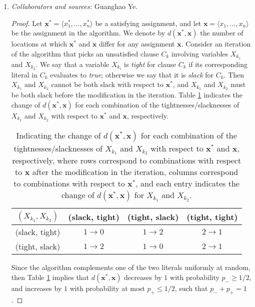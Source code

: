 \documentclass[letterpaper, reqno,11pt]{article}
\begin{document}
\begin{enumerate}
  \item \noindent\emph{Collaborators and sources:} Guanghao Ye.
  
  \begin{proof}
    Let $\mathbf x^* = \langle x_1^*, \ldots, x_n^* \rangle$ be a satisfying assignment, and let $\mathbf x = \langle x_1, \ldots, x_n \rangle$ be the assignment in the algorithm. We denote by $d(\mathbf x^*, \mathbf x)$ the number of locations at which $\mathbf x^*$ and $\mathbf x$ differ for any assignment $\mathbf x$. Consider an iteration of the algorithm that picks an unsatisfied clause $C_k$ involving variables $X_{k_1}$ and $X_{k_2}$. We say that a variable $X_{k_i}$ is \emph{tight} for clause $C_k$ if its corresponding literal in $C_k$ evaluates to \emph{true}; otherwise we say that it is \emph{slack} for $C_k$. Then $X_{k_1}$ and $X_{k_2}$ cannot be both slack with respect to $\mathbf x^*$, and $X_{k_1}$ and $X_{k_2}$ must be both slack before the modification in the iteration. Table \ref{tab:1} indicates the change of $d(\mathbf x^*, \mathbf x)$ for each combination of the tightnesses/slacknesses of $X_{k_1}$ and $X_{k_2}$ with respect to $\mathbf x^*$ and $\mathbf x$, respectively.

    \begin{table}[h]
      \centering
      \begin{tabular}{c||c|c|c}
        $(X_{k_1}, X_{k_2})$ & (slack, tight) & (tight, slack) & (tight, tight) \\
        \hline
        \hline
        (slack, tight) & $1 \to 0$ & $1 \to 2$ & $2 \to 1$ \\
        \hline
        (tight, slack) & $1 \to 2$ & $1 \to 0$ & $2 \to 1$
      \end{tabular}
      \caption{Indicating the change of $d(\mathbf x^*, \mathbf x)$ for each combination of the tightnesses/slacknesses of $X_{k_1}$ and $X_{k_2}$ with respect to $\mathbf x^*$ and $\mathbf x$, respectively, where rows correspond to combinations with respect to $\mathbf x$ after the modification in the iteration, columns correspond to combinations with respect to $\mathbf x^*$, and each entry indicates the change of $d(\mathbf x^*, \mathbf x)$ for $X_{k_1}$ and $X_{k_2}$.}
      \label{tab:1}
    \end{table}

    Since the algorithm complements one of the two literals uniformly at random, then Table \ref{tab:1} implies that $d(\mathbf x^*, \mathbf x)$ decreases by $1$ with probability $p_- \geq 1/2$, and increases by $1$ with probability at most $p_+ \leq 1/2$, such that $p_- + p_+ = 1$.


\end{proof}
\end{enumerate}
\end{document}
